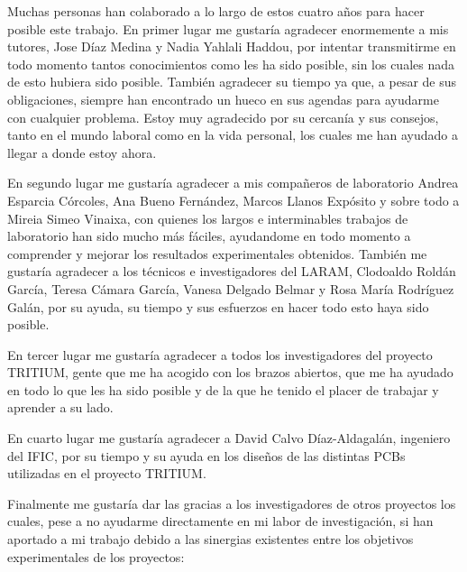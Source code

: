 Muchas personas han colaborado a lo largo de estos cuatro años para hacer posible este trabajo. En primer lugar me gustaría agradecer enormemente a mis tutores, Jose Díaz Medina y Nadia Yahlali Haddou, por intentar transmitirme en todo momento tantos conocimientos como les ha sido posible, sin los cuales nada de esto hubiera sido posible. También agradecer su tiempo ya que, a pesar de sus obligaciones, siempre han encontrado un hueco en sus agendas para ayudarme con cualquier problema. Estoy muy agradecido por su cercanía y sus consejos, tanto en el mundo laboral como en la vida personal, los cuales me han ayudado a llegar a donde estoy ahora.

En segundo lugar me gustaría agradecer a mis compañeros de laboratorio Andrea Esparcia Córcoles, Ana Bueno Fernández, Marcos Llanos Expósito y sobre todo a Mireia Simeo Vinaixa, con quienes los largos e interminables trabajos de laboratorio han sido mucho más fáciles, ayudandome en todo momento a comprender y mejorar los resultados experimentales obtenidos.  También me gustaría agradecer a los técnicos e investigadores del LARAM, Clodoaldo Roldán García, Teresa Cámara García, Vanesa Delgado Belmar y Rosa María Rodríguez Galán, por su ayuda, su tiempo y sus esfuerzos en hacer todo esto haya sido posible.

En tercer lugar me gustaría agradecer a todos los investigadores del proyecto TRITIUM, gente que me ha acogido con los brazos abiertos, que me ha ayudado en todo lo que les ha sido posible y de la que he tenido el placer de trabajar y aprender a su lado.

En cuarto lugar me gustaría agradecer a David Calvo Díaz-Aldagalán, ingeniero del IFIC, por su tiempo y su ayuda en los diseños de las distintas PCBs utilizadas en el proyecto TRITIUM.

Finalmente me gustaría dar las gracias a los investigadores de otros proyectos los cuales, pese a no ayudarme directamente en mi labor de investigación, si han aportado a mi trabajo debido a las sinergias existentes entre los objetivos experimentales de los proyectos:

